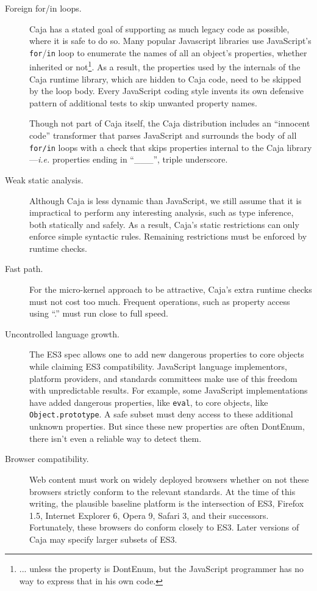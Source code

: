 \documentclass[letterpaper,twocolumn,10pt]{article}
\newcommand{\code}[1]{{\tt {#1}}}              %
\begin{document}
\begin{description}
  \item[Foreign for/in loops.] Caja has a stated goal of supporting as much legacy code as possible, where it
  is safe to do so.  Many popular Javascript libraries use JavaScript's \code{for}/\code{in} loop to enumerate the names of all an object's 
  properties, whether inherited or not\footnote{
  ... unless the property is DontEnum, but the JavaScript programmer has no way to express that in his own code.
  }. As a result, the properties used by the internals of the Caja runtime library, which are hidden to Caja code, 
  need to be skipped by the loop body. Every JavaScript coding style invents its own defensive pattern of additional 
  tests to skip unwanted property names.
  
  Though not part of Caja itself, the Caja distribution includes an ``innocent code'' transformer that parses JavaScript and
  surrounds the body of all \code{for/in} loops with a check that skips properties internal to the Caja library---\emph{i.e.}
  properties ending in ``\_\_\_'', triple underscore.
    
  \item[Weak static analysis.] Although Caja is less dynamic than JavaScript, we still assume that it is impractical 
  to perform any interesting analysis, such as type inference, both statically and safely. As a result, Caja's static 
  restrictions can only enforce simple syntactic rules. Remaining restrictions must be enforced by runtime checks.
  
  \item[Fast path.] For the micro-kernel approach to be attractive, Caja's extra runtime checks must not cost too 
  much. Frequent operations, such as property access using ``.'' must run close to full speed.
  
  \item[Uncontrolled language growth.] The ES3 spec allows one to add new dangerous properties to core objects while 
  claiming ES3 compatibility. JavaScript language implementors, platform providers, and standards committees make use 
  of this freedom with unpredictable results. For example, some JavaScript implementations have added dangerous 
  properties, like \code{eval}, to core objects, like \code{Object.prototype}. A safe subset must deny access to 
  these additional unknown properties. But since these new properties are often DontEnum, there isn't even a reliable 
  way to detect them.
  
  \item[Browser compatibility.] Web content must work on widely deployed browsers whether on not these browsers 
  strictly conform to the relevant standards. At the time of this writing, the plausible baseline platform is the 
  intersection of ES3, Firefox 1.5, Internet Explorer 6, Opera 9, Safari 3, and their successors. Fortunately, these 
  browsers do conform closely to ES3. Later versions of Caja may specify larger subsets of ES3.
  

\end{description}
\end{document}
